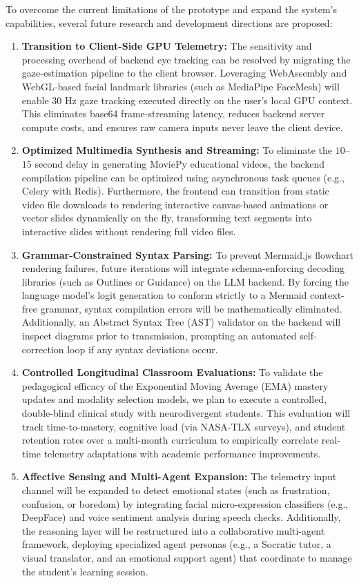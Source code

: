 \documentclass[final,5p,times,twocolumn,authoryear]{elsarticle}
\begin{document}
To overcome the current limitations of the prototype and expand the system's capabilities, several future research and development directions are proposed:
\begin{enumerate}
    \item \textbf{Transition to Client-Side GPU Telemetry:} The sensitivity and processing overhead of backend eye tracking can be resolved by migrating the gaze-estimation pipeline to the client browser. Leveraging WebAssembly and WebGL-based facial landmark libraries (such as MediaPipe FaceMesh) will enable $30\text{ Hz}$ gaze tracking executed directly on the user's local GPU context. This eliminates base64 frame-streaming latency, reduces backend server compute costs, and ensures raw camera inputs never leave the client device.
    \item \textbf{Optimized Multimedia Synthesis and Streaming:} To eliminate the $10$--$15$ second delay in generating MoviePy educational videos, the backend compilation pipeline can be optimized using asynchronous task queues (e.g., Celery with Redis). Furthermore, the frontend can transition from static video file downloads to rendering interactive canvas-based animations or vector slides dynamically on the fly, transforming text segments into interactive slides without rendering full video files.
    \item \textbf{Grammar-Constrained Syntax Parsing:} To prevent Mermaid.js flowchart rendering failures, future iterations will integrate schema-enforcing decoding libraries (such as Outlines or Guidance) on the LLM backend. By forcing the language model's logit generation to conform strictly to a Mermaid context-free grammar, syntax compilation errors will be mathematically eliminated. Additionally, an Abstract Syntax Tree (AST) validator on the backend will inspect diagrams prior to transmission, prompting an automated self-correction loop if any syntax deviations occur.
    \item \textbf{Controlled Longitudinal Classroom Evaluations:} To validate the pedagogical efficacy of the Exponential Moving Average (EMA) mastery updates and modality selection models, we plan to execute a controlled, double-blind clinical study with neurodivergent students. This evaluation will track time-to-mastery, cognitive load (via NASA-TLX surveys), and student retention rates over a multi-month curriculum to empirically correlate real-time telemetry adaptations with academic performance improvements.
    \item \textbf{Affective Sensing and Multi-Agent Expansion:} The telemetry input channel will be expanded to detect emotional states (such as frustration, confusion, or boredom) by integrating facial micro-expression classifiers (e.g., DeepFace) and voice sentiment analysis during speech checks. Additionally, the reasoning layer will be restructured into a collaborative multi-agent framework, deploying specialized agent personas (e.g., a Socratic tutor, a visual translator, and an emotional support agent) that coordinate to manage the student's learning session.
\end{enumerate}
\end{document}
